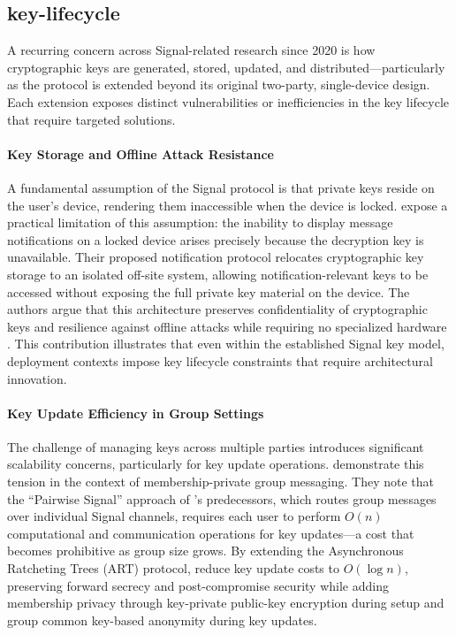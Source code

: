 \subsection{key-lifecycle}

A recurring concern across Signal-related research since 2020 is how cryptographic keys are generated, stored, updated, and distributed—particularly as the protocol is extended beyond its original two-party, single-device design. Each extension exposes distinct vulnerabilities or inefficiencies in the key lifecycle that require targeted solutions.

\paragraph{Key Storage and Offline Attack Resistance}
A fundamental assumption of the Signal protocol is that private keys reside on the user's device, rendering them inaccessible when the device is locked. \textcite{almari2024} expose a practical limitation of this assumption: the inability to display message notifications on a locked device arises precisely because the decryption key is unavailable. Their proposed notification protocol relocates cryptographic key storage to an isolated off-site system, allowing notification-relevant keys to be accessed without exposing the full private key material on the device. The authors argue that this architecture preserves confidentiality of cryptographic keys and resilience against offline attacks while requiring no specialized hardware \parencite{almari2024}. This contribution illustrates that even within the established Signal key model, deployment contexts impose key lifecycle constraints that require architectural innovation.

\paragraph{Key Update Efficiency in Group Settings}
The challenge of managing keys across multiple parties introduces significant scalability concerns, particularly for key update operations. \textcite{emura2023} demonstrate this tension in the context of membership-private group messaging. They note that the ``Pairwise Signal'' approach of \textcite{campion2020}'s predecessors, which routes group messages over individual Signal channels, requires each user to perform $O(n)$ computational and communication operations for key updates—a cost that becomes prohibitive as group size grows. By extending the Asynchronous Ratcheting Trees (ART) protocol, \textcite{emura2023} reduce key update costs to $O(\log n)$, preserving forward secrecy and post-compromise security while adding membership privacy through key-private public-key encryption during setup and group common key-based anonymity during key updates.


